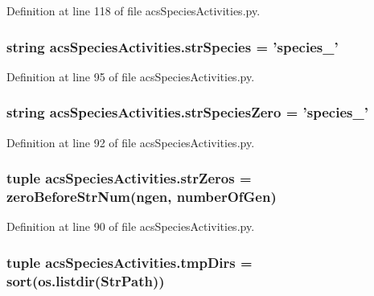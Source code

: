 Definition at line 118 of file acs\-Species\-Activities.\-py.

\hypertarget{a00097_a7ad6c119fecb41b02823a95f334daa4c}{
\subsubsection[{str\-Species}]{\setlength{\rightskip}{0pt plus 5cm}string acs\-Species\-Activities.\-str\-Species = 'species\-\_\-'}}\label{a00097_a7ad6c119fecb41b02823a95f334daa4c}


Definition at line 95 of file acs\-Species\-Activities.\-py.

\hypertarget{a00097_a78927c369e0fe9deb29777c699af346f}{
\subsubsection[{str\-Species\-Zero}]{\setlength{\rightskip}{0pt plus 5cm}string acs\-Species\-Activities.\-str\-Species\-Zero = 'species\-\_\-'}}\label{a00097_a78927c369e0fe9deb29777c699af346f}


Definition at line 92 of file acs\-Species\-Activities.\-py.

\hypertarget{a00097_ac53f52471f3cf1ef18465a07dc930dff}{
\subsubsection[{str\-Zeros}]{\setlength{\rightskip}{0pt plus 5cm}tuple acs\-Species\-Activities.\-str\-Zeros = {\bf zero\-Before\-Str\-Num}(ngen, {\bf number\-Of\-Gen})}}\label{a00097_ac53f52471f3cf1ef18465a07dc930dff}


Definition at line 90 of file acs\-Species\-Activities.\-py.

\hypertarget{a00097_addf4c61c6afe70a2ea39931695ddc36b}{
\subsubsection[{tmp\-Dirs}]{\setlength{\rightskip}{0pt plus 5cm}tuple acs\-Species\-Activities.\-tmp\-Dirs = sort(os.\-listdir({\bf Str\-Path}))}}\label{a00097_addf4c61c6afe70a2ea39931695ddc36b}


